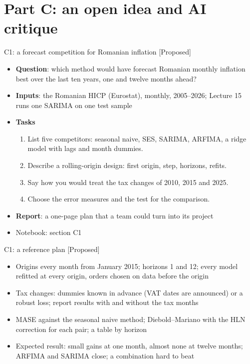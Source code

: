 \section{Part C: an open idea and AI critique}

\begin{frame}{C1: a forecast competition for Romanian inflation [Proposed]}
\itemsize{\footnotesize}
\begin{itemize}
\item \textbf{Question}: which method would have forecast Romanian monthly inflation best over the last ten years, one and twelve months ahead?
\item \textbf{Inputs}: the Romanian HICP (Eurostat), monthly, 2005--2026; Lecture 15 runs one SARIMA on one test sample
\item \textbf{Tasks}
\begin{enumerate}
    \item List five competitors: seasonal naive, SES, SARIMA, ARFIMA, a ridge model with lags and month dummies.
    \item Describe a rolling-origin design: first origin, step, horizons, refits.
    \item Say how you would treat the tax changes of 2010, 2015 and 2025.
    \item Choose the error measures and the test for the comparison.
\end{enumerate}
\item \textbf{Report}: a one-page plan that a team could turn into its project
\item Notebook: section C1
\end{itemize}
\end{frame}

\ifsolutions
\begin{frame}{C1: a reference plan [Proposed]}
\itemsize{\footnotesize}
\begin{itemize}
    \item Origins every month from January 2015; horizons 1 and 12; every model refitted at every origin, orders chosen on data before the origin
    \item Tax changes: dummies known in advance (VAT dates are announced) or a robust loss; report results with and without the tax months
    \item MASE against the seasonal naive method; Diebold--Mariano with the HLN correction for each pair; a table by horizon
    \item Expected result: small gains at one month, almost none at twelve months; ARFIMA and SARIMA close; a combination hard to beat
\end{itemize}
\end{frame}
\fi

